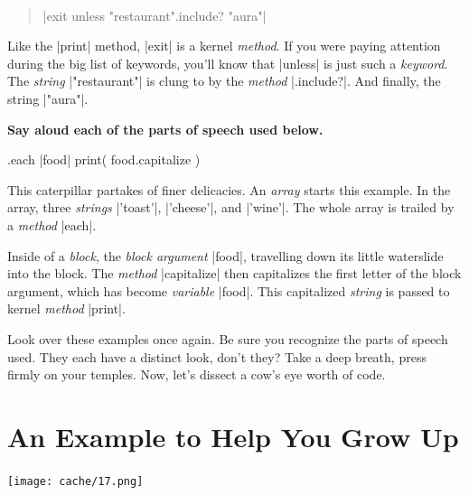 \documentclass[12pt,twoside]{report}
\begin{document}
\bigskip \bigskip \bigskip

\pagebreak

\ 

\begin{quote}
\rubyinline|exit unless "restaurant".include? "aura"|\end{quote}


Like the \rubyinline|print| method,
\rubyinline|exit| is a kernel {\em method}.  If you
were paying attention during the big list of keywords, you'll know
that \rubyinline|unless| is just such a {\em keyword}.
The {\em string} \rubyinline|"restaurant"| is clung to
by the {\em method} \rubyinline|.include?|.  And
finally, the string \rubyinline|"aura"|.

{\bf Say aloud each of the parts of speech used below.}


\begin{rubycode}
  .each { |food|
    print( food.capitalize )
  }
\end{rubycode}

This caterpillar partakes of finer delicacies.  An {\em array} starts
this example.  In the array, three {\em strings}
\rubyinline|'toast'|,
\rubyinline|'cheese'|, and
\rubyinline|'wine'|.  The whole array is trailed by a
	   {\em method} \rubyinline|each|.

Inside of a {\em block}, the {\em block argument}
\rubyinline|food|, travelling down its little
waterslide into the block.  The {\em method}
\rubyinline|capitalize| then capitalizes the first
letter of the block argument, which has become {\em variable}
\rubyinline|food|.  This capitalized {\em string} is
passed to kernel {\em method} \rubyinline|print|.

Look over these examples once again.  Be sure you recognize the parts
of speech used.  They each have a distinct look, don't they?  Take a
deep breath, press firmly on your temples.  Now, let's dissect a cow's
eye worth of code.

\bigskip \bigskip \bigskip

\pagebreak


\section{An Example to Help You Grow Up}

	\texttt{[image: cache/17.png]}

\ %
\end{document}
